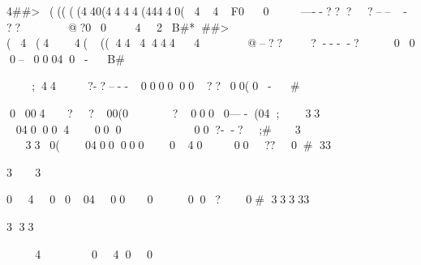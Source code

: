 4 ##>    (((((440(4444(44440(44F0  0  -----????-----??@?004 2 B#* ##>(4(44(((4444444        @--???----?000--00040-   B#%

   ;   44?-?----000000??00(0-     #%


 0004??00(0?0000----(04;%
   33
 04000400000?--?;#%
  
3
    33 0(040000004000??0 #%
    
33

 3  
3

 04000400000?0 #%
33333

 3
      33


 40400